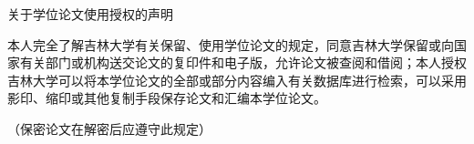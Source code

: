 \begin{mcopyright}
	\centerline{\Large 关于学位论文使用授权的声明}
	\thispagestyle{empty}
	{
		\vskip 1.5cm
		本人完全了解吉林大学有关保留、使用学位论文的规定，同意吉林大学保留或向国家有关部门或机构送交论文的复印件和电子版，允许论文被查阅和借阅；本人授权吉林大学可以将本学位论文的全部或部分内容编入有关数据库进行检索，可以采用影印、缩印或其他复制手段保存论文和汇编本学位论文。
		
		（保密论文在解密后应遵守此规定）\\
	}
\end{mcopyright}